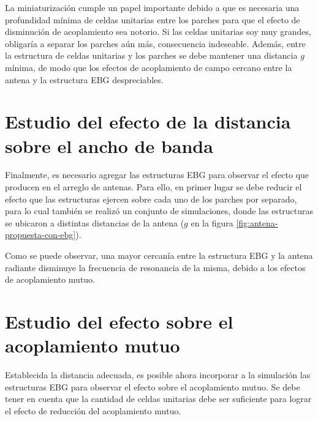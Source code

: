 La miniaturización cumple un papel importante debido a que es necesaria una profundidad mínima de celdas unitarias entre los parches para que el efecto de disminución de acoplamiento sea notorio. Si las celdas unitarias soy muy grandes, obligaría a separar los parches aún más, consecuencia indeseable. Además, entre la estructura de celdas unitarias y los parches se debe mantener una distancia $g$ mínima, de modo que los efectos de acoplamiento de campo cercano entre la antena y la estructura EBG despreciables.

\section{Estudio del efecto de la distancia sobre el ancho de banda}
\label{sec_efecto_distancia}

Finalmente, es necesario agregar las estructuras EBG para observar el efecto que producen en el arreglo de antenas. Para ello, en primer lugar se debe reducir el efecto que las estructuras ejercen sobre cada uno de los parches por separado, para lo cual también se realizó un conjunto de simulaciones, donde las estructuras se ubicaron a distintas distancias de la antena ($g$ en la figura \ref{fig:antena-propuesta-con-ebg}).

Como se puede observar, una mayor cercanía entre la estructura EBG y la antena radiante disminuye la frecuencia de resonancia de la misma, debido a los efectos de acoplamiento mutuo.

\section{Estudio del efecto sobre el acoplamiento mutuo}
\label{sec_estudio_acoplam_mutuo}
Establecida la distancia adecuada, es posible ahora incorporar a la simulación las estructuras EBG para observar el efecto sobre el acoplamiento mutuo. Se debe tener en cuenta que la cantidad de celdas unitarias debe ser suficiente para lograr el efecto de reducción del acoplamiento mutuo.




